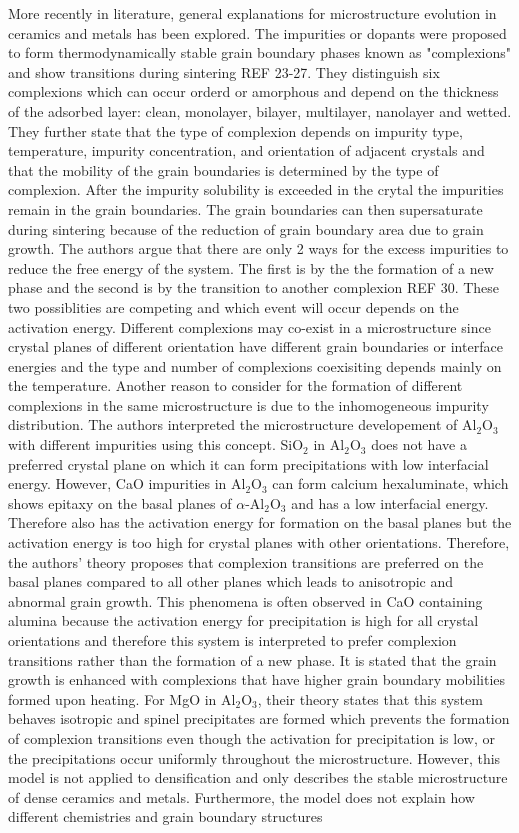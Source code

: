 More recently in literature, general explanations for microstructure evolution in ceramics and metals has been explored. The impurities or dopants were proposed to form thermodynamically stable grain boundary phases known as "complexions" and show transitions during sintering REF 23-27. They distinguish six complexions which can occur orderd or amorphous and depend on the thickness of the adsorbed layer: clean, monolayer, bilayer, multilayer, nanolayer and wetted.  They further state that the type of complexion depends on impurity type, temperature, impurity concentration, and orientation of adjacent crystals and that the mobility of the grain boundaries is determined by the type of complexion. After the impurity solubility is exceeded in the crytal the impurities remain in the grain boundaries. The grain boundaries can then supersaturate during sintering because of the reduction of grain boundary area due to grain growth. The authors argue that there are only 2 ways for the excess impurities to reduce the free energy of the system. The first is by the the formation of a new phase and the second is by the transition to another complexion REF 30. These two possiblities are competing and which event will occur depends on the activation energy. Different complexions may co-exist in a microstructure since crystal planes of different orientation have different grain boundaries or interface energies and the type and number of complexions coexisiting depends mainly on the temperature. Another reason to consider for the formation of different complexions in the same microstructure is due to the inhomogeneous impurity distribution. The authors interpreted the microstructure developement of Al$_{2}$O$_{3}$ with different impurities using this concept. SiO$_{2}$ in Al$_{2}$O$_{3}$ does not have a preferred crystal plane on which it can form precipitations with low interfacial energy. However, CaO impurities in Al$_{2}$O$_{3}$ can form calcium hexaluminate, which shows epitaxy on the basal planes of $\alpha$-Al$_{2}$O$_{3}$ and has a low interfacial energy. Therefore also has the activation energy for formation on the basal planes but the activation energy is too high for crystal planes with other orientations. Therefore, the authors' theory proposes that complexion transitions are preferred on the basal planes compared to all other planes which leads to anisotropic and abnormal grain growth. This phenomena is often observed in CaO containing alumina because the activation energy for precipitation is high for all crystal orientations and therefore this system is interpreted to prefer complexion transitions rather than the formation of a new phase. It is stated that the grain growth is enhanced with complexions that have higher grain boundary mobilities formed upon heating. For MgO in Al$_{2}$O$_{3}$, their theory states that this system behaves isotropic and spinel precipitates are formed which prevents the formation of complexion transitions even though the activation for precipitation is low, or the precipitations occur uniformly throughout the microstructure. However, this model is not applied to densification and only describes the stable microstructure of dense ceramics and metals. Furthermore, the model does not explain how different chemistries and grain boundary structures 